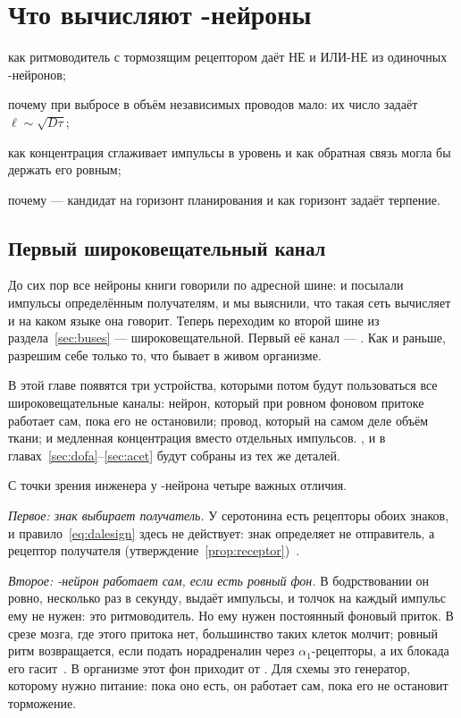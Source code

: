\chapter{Что вычисляют -нейроны}
\label{sec:serocomputer}
\begin{chaptergoals}
\item как ритмоводитель с тормозящим рецептором даёт НЕ и ИЛИ-НЕ из одиночных -нейронов;
\item почему при выбросе в объём независимых проводов мало: их число задаёт $\ell\sim\sqrt{D\tau}$;
\item как концентрация сглаживает импульсы в уровень и как обратная связь могла бы держать его ровным;
\item почему  --- кандидат на горизонт планирования и как горизонт задаёт терпение.
\end{chaptergoals}

\section{Первый широковещательный канал}

До сих пор все нейроны книги говорили по адресной шине:  и  посылали импульсы определённым получателям, и мы выяснили, что такая сеть вычисляет и на каком языке она говорит. Теперь переходим ко второй шине из раздела~\ref{sec:buses} --- широковещательной. Первый её канал --- . Как и раньше, разрешим себе только то, что бывает в живом организме.

В этой главе появятся три устройства, которыми потом будут пользоваться все широковещательные каналы: нейрон, который при ровном фоновом притоке работает сам, пока его не остановили; провод, который на самом деле объём ткани; и медленная концентрация вместо отдельных импульсов. ,  и  в главах~\ref{sec:dofa}--\ref{sec:acet} будут собраны из тех же деталей.

С точки зрения инженера у -нейрона четыре важных отличия.

\emph{Первое: знак выбирает получатель.} У серотонина есть рецепторы обоих знаков, и правило~\eqref{eq:dalesign} здесь не действует: знак определяет не отправитель, а рецептор получателя (утверждение~\ref{prop:receptor})~\cite{BarnesSharp1999}.

\emph{Второе: -нейрон работает сам, если есть ровный фон.} В бодрствовании он ровно, несколько раз в секунду, выдаёт импульсы, и толчок на каждый импульс ему не нужен: это ритмоводитель. Но ему нужен постоянный фоновый приток. В срезе мозга, где этого притока нет, большинство таких клеток молчит; ровный ритм возвращается, если подать норадреналин через $\alpha_1$-рецепторы, а их блокада его гасит~\cite{VandermaelenAghajanian1983}. В организме этот фон приходит от . Для схемы это генератор, которому нужно питание: пока оно есть, он работает сам, пока его не остановит торможение.

